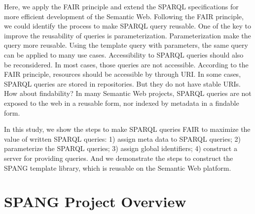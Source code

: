 \documentclass[runningheads]{llncs}
\begin{document}

Here, we apply the FAIR principle and extend the SPARQL specifications for more efficient development of the Semantic Web.
Following the FAIR principle, we could identify the process to make SPARQL query reusable.
One of the key to improve the reusability of queries is parameterization.
Parameterization make the query more reusable.
Using the template query with parameters, the same query can be applied to many use cases.
Accessibility to SPARQL queries should also be reconsidered.
In most cases, those queries are not accessible. According to the FAIR principle, resources should be accessible by through URI. In some cases, SPARQL queries are stored in repositories. But they do not have stable URIs. How about findability? 
In many Semantic Web projects, 
SPARQL queries are not exposed to the web in a reusable form, nor indexed by metadata in a findable form.

In this study, we show the steps to make SPARQL queries FAIR to maximize the value of written SPARQL queries:
1) assign meta data to SPARQL queries;
2) parameterize the SPARQL queries;
3) assign global identifiers;
4) construct a server for providing queries.
And we demonstrate the steps to construct the SPANG template library, which is reusable on the Semantic Web platform.


\section{SPANG Project Overview}
\end{document}
